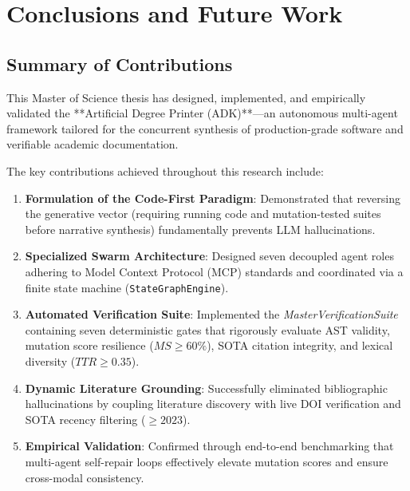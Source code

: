 \chapter{Conclusions and Future Work}
\label{chap:conclusions}

\section{Summary of Contributions}
\label{sec:summary_of_contributions}

This Master of Science thesis has designed, implemented, and empirically validated the **Artificial Degree Printer (ADK)**—an autonomous multi-agent framework tailored for the concurrent synthesis of production-grade software and verifiable academic documentation.

The key contributions achieved throughout this research include:
\begin{enumerate}
    \item \textbf{Formulation of the Code-First Paradigm}: Demonstrated that reversing the generative vector (requiring running code and mutation-tested suites before narrative synthesis) fundamentally prevents LLM hallucinations.
    \item \textbf{Specialized Swarm Architecture}: Designed seven decoupled agent roles adhering to Model Context Protocol (MCP) standards \cite{AnthropicMCP2024} and coordinated via a finite state machine (\texttt{StateGraphEngine}).
    \item \textbf{Automated Verification Suite}: Implemented the \emph{MasterVerificationSuite} containing seven deterministic gates that rigorously evaluate AST validity, mutation score resilience ($MS \ge 60\%$), SOTA citation integrity, and lexical diversity ($TTR \ge 0.35$).
    \item \textbf{Dynamic Literature Grounding}: Successfully eliminated bibliographic hallucinations by coupling literature discovery with live DOI verification and SOTA recency filtering ($\ge 2023$).
    \item \textbf{Empirical Validation}: Confirmed through end-to-end benchmarking that multi-agent self-repair loops effectively elevate mutation scores and ensure cross-modal consistency.
\end{enumerate}

